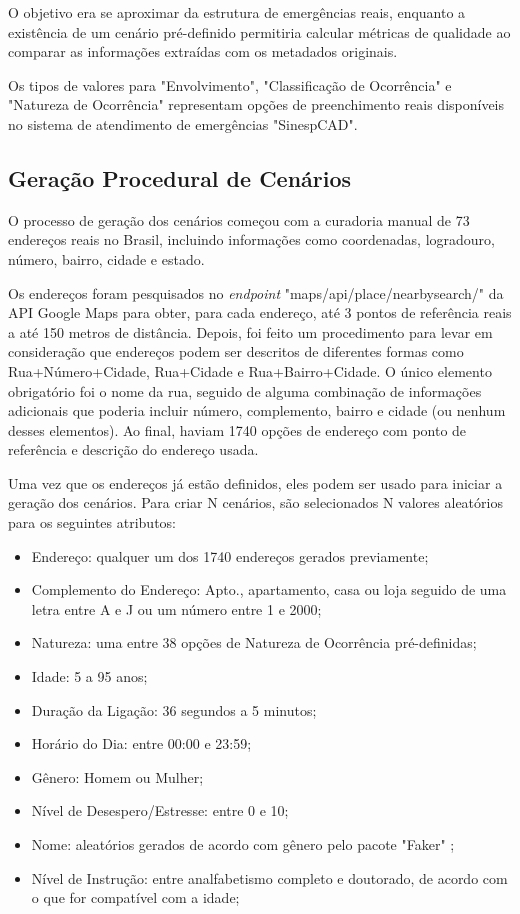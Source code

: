 \documentclass{IEEEphot}
\begin{document}
O objetivo era se aproximar da estrutura de emergências reais, enquanto a existência de um cenário pré-definido permitiria calcular métricas de qualidade ao comparar as informações extraídas com os metadados originais.

Os tipos de valores para "Envolvimento", "Classificação de Ocorrência" e "Natureza de Ocorrência" representam opções de preenchimento reais disponíveis no sistema de atendimento de emergências "SinespCAD".

\subsection{Geração Procedural de Cenários}

O processo de geração dos cenários começou com a curadoria manual de 73 endereços reais no Brasil, incluindo informações como coordenadas, logradouro, número, bairro, cidade e estado. 

Os endereços foram pesquisados no \textit{endpoint} "maps/api/place/nearbysearch/" da API Google Maps \cite{google_places_api} para obter, para cada endereço, até 3 pontos de referência reais a até 150 metros de distância. Depois, foi feito um procedimento para levar em consideração que endereços podem ser descritos de diferentes formas como Rua+Número+Cidade, Rua+Cidade e Rua+Bairro+Cidade. O único elemento obrigatório foi o nome da rua, seguido de alguma combinação de informações adicionais que poderia incluir número, complemento, bairro e cidade (ou nenhum desses elementos). Ao final, haviam 1740 opções de endereço com ponto de referência e descrição do endereço usada.

Uma vez que os endereços já estão definidos, eles podem ser usado para iniciar a geração dos cenários. Para criar N cenários, são selecionados N valores aleatórios para os seguintes atributos: 

\begin{itemize}
    \item Endereço: qualquer um dos 1740 endereços gerados previamente;
    \item Complemento do Endereço: Apto., apartamento, casa ou loja seguido de uma letra entre A e J ou um número entre 1 e 2000;
    \item Natureza: uma entre 38 opções de Natureza de Ocorrência pré-definidas;
    \item Idade: 5 a 95 anos;
    \item Duração da Ligação: 36 segundos a 5 minutos;
    \item Horário do Dia: entre 00:00 e 23:59;
    \item Gênero: Homem ou Mulher;
    \item Nível de Desespero/Estresse: entre 0 e 10;
    \item Nome: aleatórios gerados de acordo com gênero pelo pacote "Faker" \cite{faker_package};
    \item Nível de Instrução: entre analfabetismo completo e doutorado, de acordo com o que for compatível com a idade;
\end{itemize}
\end{document}

